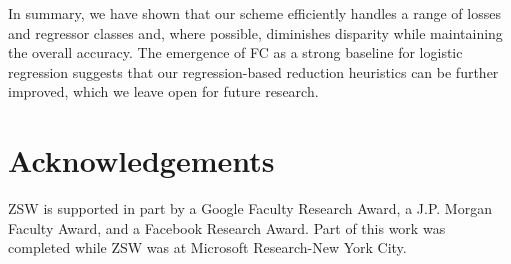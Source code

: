 \documentclass{article}
\begin{document}
In summary,
we have shown that our scheme efficiently handles a range of losses and regressor classes and, where possible, diminishes disparity while maintaining the overall accuracy. The emergence of FC
as a strong baseline for logistic regression suggests that our regression-based reduction heuristics can be further improved, which we leave open for future research.






\section*{Acknowledgements}
ZSW is supported in part by a Google Faculty Research Award, a J.P.
Morgan Faculty Award, and a Facebook Research Award. Part of this work
was completed while ZSW was at Microsoft Research-New York City.









\appendix

\end{document}
